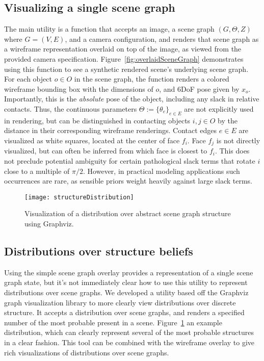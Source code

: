 \subsection{Visualizing a single scene graph}
The main utility is a function that accepts an image, a scene graph $(G, \Theta, Z)$ where $G = (V,E)$, and a camera configuration, and renders that scene graph as a wireframe representation overlaid on top of the image, as viewed from the provided camera specification.
Figure~\ref{fig:overlaidSceneGraph} demonstrates using this function to see a synthetic rendered scene's underlying scene graph.
For each object $o \in O$ in the scene graph, the function renders a colored wireframe bounding box with the dimensions of $o$, and 6DoF pose given by $x_o$.
Importantly, this is the \textit{absolute} pose of the object, including any slack in relative contacts.
Thus, the continuous parameters $\Theta := \{\theta_e\}_{e \in E}$ are not explicitly used in rendering, but can be distinguished in contacting objects $i,j \in O$ by the distance in their corresponding wireframe renderings.
Contact edges $e \in E$ are visualized as white squares, located at the center of face $f_i$.
Face $f_j$ is not directly visualized, but can often be inferred from which face is closest to $f_i$.
This does not preclude potential ambiguity for certain pathological slack terms that rotate $i$ close to a multiple of $\pi/2$.
However, in practical modeling applications such occurrences are rare, as sensible priors weight heavily against large slack terms.

\raggedbottom
\pagebreak
\flushbottom

\begin{figure}[H]
  \centering
  \texttt{[image: structureDistribution]}
  \caption{
    Visualization of a distribution over abstract scene graph structure using Graphviz.
  }
  \label{fig:structureDistribution}
\end{figure}
\subsection{Distributions over structure beliefs}
Using the simple scene graph overlay provides a representation of a single scene graph state, but it's not immediately clear how to use this utility to represent distributions over scene graphs.
We developed a utility based off the Graphviz~\cite{Ellson03graphvizand} graph visualization library to more clearly view distributions over discrete structure.
It accepts a distribution over scene graphs, and renders a specified number of the most probable present in a scene.
Figure~\ref{fig:structureDistribution} an example distribution, which can clearly represent several of the most probable structures in a clear fashion.
This tool can be combined with the wireframe overlay to give rich visualizations of distributions over scene graphs.

